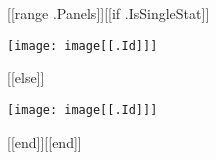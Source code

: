 \documentclass[10pt,a4paper]{article}
\begin{document}
\begin{landscape}
\begin{center}
[[range .Panels]][[if .IsSingleStat]]\begin{minipage}{0.3\textwidth}
\texttt{[image: image[[.Id]]]}
\end{minipage}
[[else]]\par
\hspace{0cm}
\texttt{[image: image[[.Id]]]}
\par
\hspace{0cm}
[[end]][[end]]
\end{center}
\end{landscape}
\end{document}
